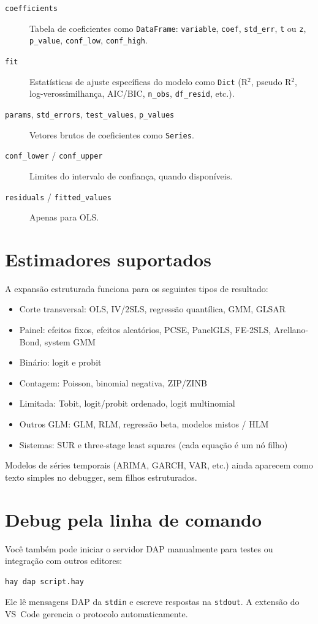 \begin{description}
  \item[\texttt{coefficients}] Tabela de coeficientes como \texttt{DataFrame}: \texttt{variable}, \texttt{coef}, \texttt{std\_err}, \texttt{t} ou \texttt{z}, \texttt{p\_value}, \texttt{conf\_low}, \texttt{conf\_high}.
  \item[\texttt{fit}] Estatísticas de ajuste específicas do modelo como \texttt{Dict} (R$^2$, pseudo R$^2$, log-verossimilhança, AIC/BIC, \texttt{n\_obs}, \texttt{df\_resid}, etc.).
  \item[\texttt{params}, \texttt{std\_errors}, \texttt{test\_values}, \texttt{p\_values}] Vetores brutos de coeficientes como \texttt{Series}.
  \item[\texttt{conf\_lower} / \texttt{conf\_upper}] Limites do intervalo de confiança, quando disponíveis.
  \item[\texttt{residuals} / \texttt{fitted\_values}] Apenas para OLS.
\end{description}

\section{Estimadores suportados}

A expansão estruturada funciona para os seguintes tipos de resultado:

\begin{itemize}
  \item Corte transversal: OLS, IV/2SLS, regressão quantílica, GMM, GLSAR
  \item Painel: efeitos fixos, efeitos aleatórios, PCSE, PanelGLS, FE-2SLS, Arellano-Bond, system GMM
  \item Binário: logit e probit
  \item Contagem: Poisson, binomial negativa, ZIP/ZINB
  \item Limitada: Tobit, logit/probit ordenado, logit multinomial
  \item Outros GLM: GLM, RLM, regressão beta, modelos mistos / HLM
  \item Sistemas: SUR e three-stage least squares (cada equação é um nó filho)
\end{itemize}

\begin{nota}
  Modelos de séries temporais (ARIMA, GARCH, VAR, etc.) ainda aparecem como texto simples no debugger, sem filhos estruturados.
\end{nota}

\section{Debug pela linha de comando}

Você também pode iniciar o servidor DAP manualmente para testes ou integração com outros editores:

\begin{lstlisting}[style=inline, language=sh]
hay dap script.hay
\end{lstlisting}

Ele lê mensagens DAP da \texttt{stdin} e escreve respostas na \texttt{stdout}. A extensão do VS~Code gerencia o protocolo automaticamente.
